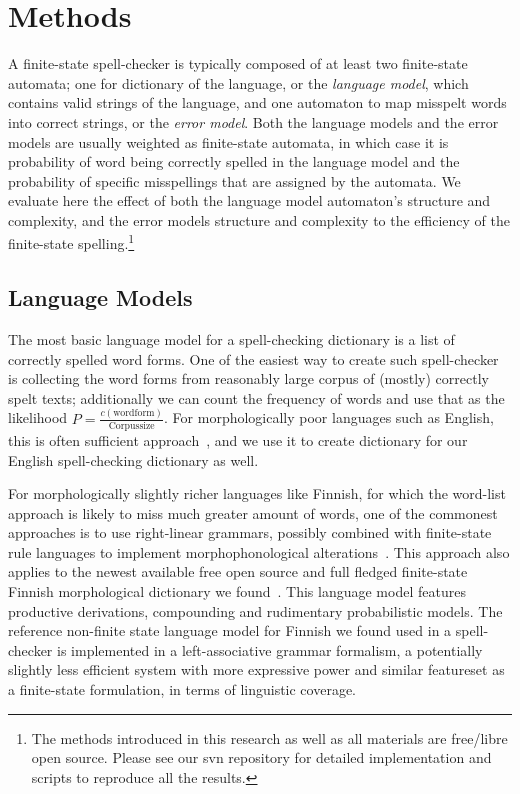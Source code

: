 \documentclass[11pt]{article}
\begin{document}
\section{Methods}
\label{sec:methods}

A finite-state spell-checker is typically composed of at least two finite-state
automata; one for dictionary of the language, or the \emph{language model},
which contains valid strings of the language, and one automaton to map misspelt
words into correct strings, or the \emph{error model}. Both the language models
and the error models are usually weighted as finite-state automata, in which
case it is probability of word being correctly spelled in the language model
and the probability of specific misspellings that are assigned by the automata.
We evaluate here the effect of both the language model automaton's structure
and complexity, and the error models structure and complexity to the efficiency
of the finite-state spelling.\footnote{The methods introduced in this research
as well as all materials are free/libre open source. Please see our svn
repository for detailed implementation and scripts to reproduce all the
results.}

\subsection{Language Models}
\label{subsec:language-models}

The most basic language model for a spell-checking dictionary is a list of
correctly spelled word forms. One of the easiest way to create such 
spell-checker is collecting the word forms from reasonably large corpus of
(mostly) correctly spelt texts; additionally we can count the frequency of words
and use that as the likelihood $P=\frac{c(\mathrm{wordform})}{\mathrm{Corpus size}}$.
For morphologically poor languages such as English, this is often sufficient
approach~\cite{norvig/2010}, and we use it to create dictionary for our English
spell-checking dictionary as well.

For morphologically slightly richer languages like Finnish, for which the
word-list approach is likely to miss much greater amount of words, one of the
commonest approaches is to use right-linear grammars, possibly combined with
finite-state rule languages to implement morphophonological
alterations~\cite{koskenniemi/1983}. This approach also applies to the newest
available free open source and full fledged finite-state Finnish morphological
dictionary we found~\cite{pirinen/2011/nodalida}. This language model features
productive derivations, compounding and rudimentary probabilistic models.
The reference non-finite state language model for Finnish we found
used in a spell-checker is implemented in a left-associative grammar
formalism, a potentially slightly less efficient system with more expressive
power and similar featureset as a finite-state formulation, in terms of
linguistic coverage.
\end{document}
